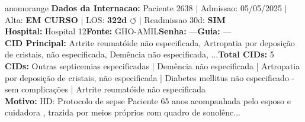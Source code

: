 \documentclass[a4paper,10pt]{article}
\begin{document}
\begin{anomalycard}[Internacao 3677 | GHO-AMIL | ALTO (z=3.46)]{anomorange}
\textbf{Dados da Internacao:} Paciente 2638 $\mid$ Admissao: 05/05/2025 $\mid$ Alta: \textcolor{anomorange}{\textbf{EM CURSO}} $\mid$ LOS: \textbf{322d \textcolor{anomorange}{$\circlearrowleft$}} $\mid$ Readmissao 30d: \textcolor{anomred}{\textbf{SIM}}\\
\textbf{Hospital:} Hospital 12\quad\textbf{Fonte:} GHO-AMIL\quad\textbf{Senha:} ---\quad\textbf{Guia:} ---\\
\textbf{CID Principal:} {\small Artrite reumatóide não especificada, Artropatia por deposição de cristais, não especificada, Demência não especificada, ...}\quad\textbf{Total CIDs:} 5\\

\textbf{CIDs:} {\scriptsize Outras septicemias especificadas | Demência não especificada | Artropatia por deposição de cristais, não especificada | Diabetes mellitus não especificado - sem complicações | Artrite reumatóide não especificada}\\

\textbf{Motivo:} {\scriptsize HD: Protocolo de sepse  Paciente 65 anos acompanhada pelo esposo e cuidadora , trazida por meios próprios com quadro de sonolênc...}\\


\end{anomalycard}
\end{document}
